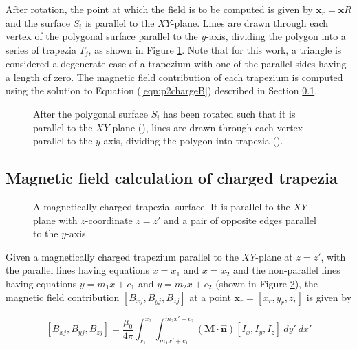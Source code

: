 After rotation, the point at which the field is to be computed is given by \(\mathbf{x}_r = \mathbf{x}R\) and the surface \(S_{\!i}\) is parallel to the \(XY\)-plane. Lines are drawn through each vertex of the polygonal surface parallel to the \(y\)-axis, dividing the polygon into a series of trapezia \(T_{\!j}\), as shown in Figure \ref{fig:p2polyhedrondecomposition}. Note that for this work, a triangle is considered a degenerate case of a trapezium with one of the parallel sides having a length of zero. The magnetic field contribution of each trapezium is computed using the solution to Equation (\ref{eqn:p2chargeB}) described in Section \ref{sec:p2fieldcalc}.
\begin{figure}[h]
	\centering
	
	\caption{After the polygonal surface \(S_{\!i}\) has been rotated such that it is parallel to the \(XY\)-plane (), lines are drawn through each vertex parallel to the \(y\)-axis, dividing the polygon into trapezia ().}
	\label{fig:p2polyhedrondecomposition}
\end{figure}

\subsection{Magnetic field calculation of charged trapezia}\label{sec:p2fieldcalc}

\begin{figure}
	\centering
	
	\caption{A magnetically charged trapezial surface. It is parallel to the \(XY\)-plane with \(z\)-coordinate \(z = z'\) and a pair of opposite edges parallel to the \(y\)-axis.}
	\label{fig:p2trapezium}
\end{figure}

Given a magnetically charged trapezium parallel to the \(XY\)-plane at \(z = z'\), with the parallel lines having equations \(x = x_1\) and \(x = x_2\) and the non-parallel lines having equations \mbox{\(y = m_1x+c_1\)} and \mbox{\(y = m_2x+c_2\)} (shown in Figure \ref{fig:p2trapezium}), the magnetic field contribution \(\left[B_{xj},B_{yj},B_{zj}\right]\) at a point \(\mathbf{x}_r = \left[ x_r, y_r, z_r \right]\) is given by

\begin{equation}
	\label{eqn:p2myintegral}
	\left[ B_{xj}, B_{yj}, B_{zj} \right] = \frac{\mu_0}{4\pi} \int_{x_1}^{x_2} \int_{m_1x'+c_1}^{m_2x'+c_2} \left( \mathbf{M} \cdot \hat{\mathbf{n}} \right) \left[ I_x, I_y, I_z \right] \ dy' \ dx'
\end{equation}

